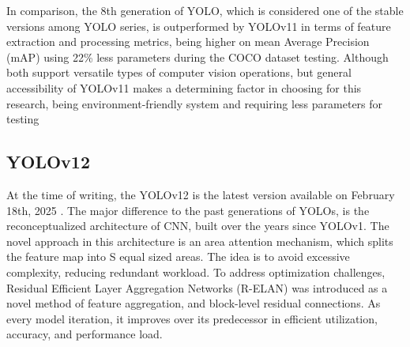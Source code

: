\begin{multicols}{2}
In comparison, the 8th generation of YOLO, which is considered one of the stable versions among YOLO series, is outperformed by YOLOv11 in terms of feature extraction and processing metrics, being higher on mean Average Precision (mAP) using 22\% less parameters during the COCO dataset testing. Although both support versatile types of computer vision operations, but general accessibility of YOLOv11 makes a determining factor in choosing for this research, being environment-friendly system and requiring less parameters for testing

\subsection{YOLOv12}
At the time of writing, the YOLOv12 is the latest version available on February 18th, 2025 \citep{Roboflow2025}. The major difference to the past generations of YOLOs, is the reconceptualized architecture of CNN, built over the years since YOLOv1. The novel approach in this architecture is an area attention mechanism, which splits the feature map into S equal sized areas. The idea is to avoid excessive complexity, reducing redundant workload. To address optimization challenges, Residual Efficient Layer Aggregation Networks (R-ELAN) was introduced as a novel method of feature aggregation, and block-level residual connections. As every model iteration, it improves over its predecessor in efficient utilization, accuracy, and performance load.

\end{multicols}